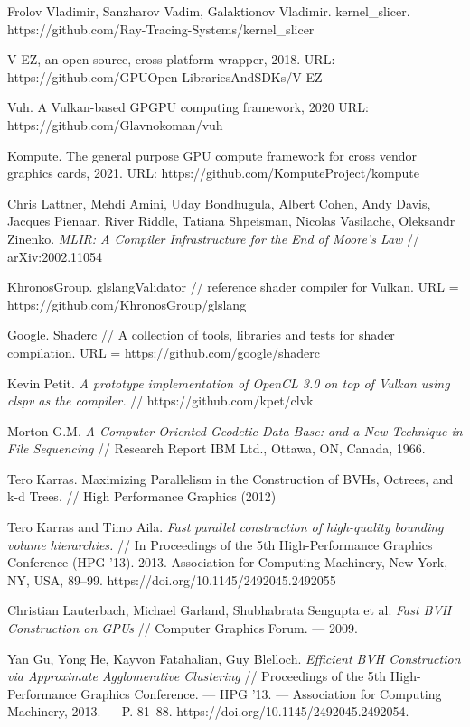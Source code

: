 \documentclass[11pt,fleqn,english,russian]{report} %
\begin{document}
\begin{thebibliography}{10}
	 Frolov Vladimir, Sanzharov Vadim, Galaktionov Vladimir. kernel\_slicer. https://github.com/Ray-Tracing-Systems/kernel\_slicer
	
	 V-EZ, an open source, cross-platform wrapper, 2018. URL: https://github.com/GPUOpen-LibrariesAndSDKs/V-EZ
	
	 Vuh. A Vulkan-based GPGPU computing framework, 2020 URL: https://github.com/Glavnokoman/vuh
	
	 Kompute. The general purpose GPU compute framework for cross vendor graphics cards, 2021. URL: https://github.com/KomputeProject/kompute
	
	 Chris Lattner, Mehdi Amini, Uday Bondhugula, Albert Cohen, Andy Davis, Jacques Pienaar, River Riddle, Tatiana Shpeisman, Nicolas Vasilache, Oleksandr Zinenko. \textit{MLIR: A Compiler Infrastructure for the End of Moore's Law} // arXiv:2002.11054
	
	 KhronosGroup. glslangValidator // reference shader compiler for Vulkan. URL = https://github.com/KhronosGroup/glslang
	
	 Google. Shaderc // A collection of tools, libraries and tests for shader compilation. URL = https://github.com/google/shaderc
	
	 Kevin Petit. \textit{A prototype implementation of OpenCL 3.0 on top of Vulkan using clspv as the compiler.} // https://github.com/kpet/clvk
	
	 Morton G.M. \textit{A Computer Oriented Geodetic Data Base: and a New Technique in File Sequencing} // Research Report IBM Ltd., Ottawa, ON, Canada, 1966.
	
	 Tero Karras. Maximizing Parallelism in the Construction of BVHs, Octrees, and k-d Trees. // High Performance Graphics (2012)
	
	 Tero Karras and Timo Aila. \textit{Fast parallel construction of high-quality bounding volume hierarchies.} // In Proceedings of the 5th High-Performance Graphics Conference (HPG '13). 2013. Association for Computing Machinery, New York, NY, USA, 89–99. https://doi.org/10.1145/2492045.2492055
	
	 Christian Lauterbach, Michael Garland, Shubhabrata Sengupta et al. \textit{Fast BVH Construction on GPUs} // Computer Graphics Forum. — 2009.
	
	 Yan Gu, Yong He, Kayvon Fatahalian, Guy Blelloch. \textit{Efficient BVH Construction via Approximate Agglomerative Clustering} // Proceedings of the 5th High-Performance Graphics Conference. — HPG ’13. — Association for Computing Machinery, 2013. — P. 81–88. https://doi.org/10.1145/2492045.2492054.
	

\end{thebibliography}
\end{document}

